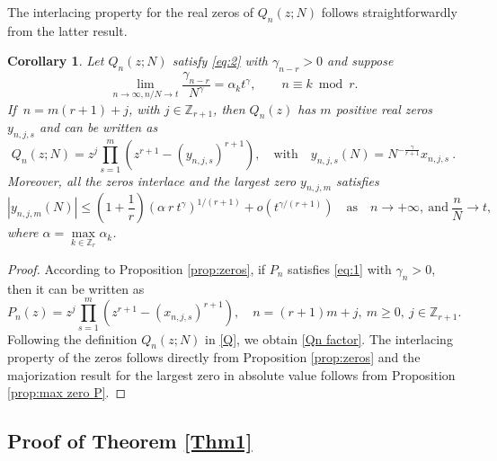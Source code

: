 \documentclass[12pt]{article}
\newtheorem{corollary}[proposition]{Corollary}
\numberwithin{equation}{section}
\begin{document}
The interlacing property for the real zeros of $Q_{n}(z;N)$ follows straightforwardly from the latter result. 


\begin{corollary}\label{cor:zero bounds} Let $Q_n(z;N)$ satisfy \eqref{eq:2} with $\gamma_{n-r}>0$ and suppose 
\begin{equation}\label{gamma lim}
	\lim_{n\to \infty, n/N\to t} \frac{\gamma_{n-r}}{N^\gamma} =  \alpha_k t^{\gamma}, \qquad  n \equiv k \bmod r. 
\end{equation}
If $\ n=m (r+1)+j$, with $j\in\mathbb{Z}_{r+1}$, then $Q_{n}(z)$ has $m$ positive real zeros $y_{n,j,s}$ and can be written as 
\begin{equation}\label{Qn factor}
	Q_n(z;N) = z^{j} \prod_{s=1}^m \left( z^{r+1} - (y_{n,j,s})^{r+1}  \right), \quad\text{with} \quad
	y_{n,j,s}(N)= N^{-\frac{\gamma}{r+1}}x_{n,j,s} \ . 
\end{equation}
 Moreover, all the zeros interlace and the largest zero 
$y_{n,j,m}$  satisfies 
\[
	|y_{n,j,m}(N)| \leq  \left( 1 + \frac{1}{r}\right) \left( \alpha\  r \ t^{\gamma} \right)^{1/(r+1)}+ o\left(t^{\gamma/(r+1)}\right) 
	\quad \text{as}\quad n\to+\infty, \ \text{and} \  \frac{n}{N}\to t, 
\]
where $\alpha=\max\limits_{k\in\mathbb{Z}_r} \alpha_k$. 
\end{corollary}
\begin{proof}
According to Proposition \ref{prop:zeros}, if  $P_n$ satisfies \eqref{eq:1} with $\gamma_n>0$, then it can be written as 
\[ 
	P_n(z) = z^{j} \prod_{s=1}^m \left( z^{r+1} - (x_{n,j,s})^{r+1}  \right), \quad n = (r+1)m+j, \ m\geq 0, \ j\in\mathbb{Z}_{r+1}. 
\]
Following the definition $Q_n(z;N)$ in \eqref{Q}, we obtain \eqref{Qn factor}. The interlacing property of the zeros follows directly from Proposition \ref{prop:zeros} and the majorization result for the largest zero in absolute value follows from Proposition \ref{prop:max zero P}. 
\end{proof}




\subsection{Proof of Theorem \ref{Thm1}}\label{Subsec Proof Thm1}
\end{document}
